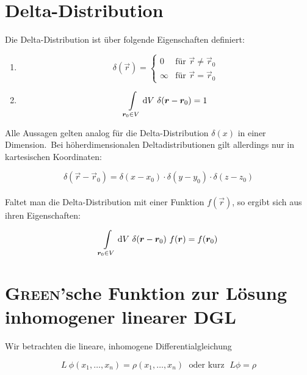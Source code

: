 \section{Delta-Distribution}

Die Delta-Distribution ist über folgende Eigenschaften definiert:

\begin{enumerate}
\item
\begin{equation*}
\delta(\vec{r}) = \begin{cases}
0 & \text{für }\vec{r}\neq\vec{r}_0\\
\infty & \text{für } \vec{r} = \vec{r}_0
\end{cases}
\end{equation*}

\item
\begin{equation*}
\int\limits_{\vec{r}_0\in V}\d V \ \delta({\vec{r}-\vec{r}_0}) = 1
\end{equation*}
\end{enumerate}

Alle Aussagen gelten analog für die Delta-Distribution $\delta(x)$ in einer Dimension.\
Bei höherdimensionalen Deltadistributionen gilt allerdings nur in kartesischen Koordinaten:

\begin{equation*}
\delta(\vec{r} - \vec{r}_0) = \delta(x-x_0)\cdot\delta(y-y_0)\cdot\delta(z-z_0)
\end{equation*}
\ \\
Faltet man die Delta-Distribution mit einer Funktion $f(\vec{r})$, so ergibt sich aus ihren Eigenschaften:

\begin{equation*}
\int\limits_{\vec{r}_0\in V}\d V \ \delta({\vec{r}-\vec{r}_0}) \ f(\vec{r}) = f(\vec{r}_0)
\end{equation*}

\section{\textsc{Green}'sche Funktion zur Lösung inhomogener linearer DGL}

Wir betrachten die lineare, inhomogene Differentialgleichung

\begin{equation*}
L \ \phi (x_1,\dotsc,x_n) = \rho (x_1,\dotsc,x_n) \; \text{ oder kurz } \; L\phi = \rho
\end{equation*}

